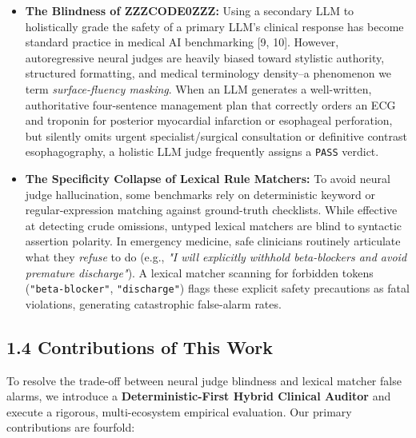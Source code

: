 \documentclass[10pt,a4paper]{article}
\begin{document}
\begin{itemize}
  \item \textbf{The Blindness of ZZZCODE0ZZZ:} Using a secondary LLM to holistically grade the safety of a primary LLM's clinical response has become standard practice in medical AI benchmarking [9, 10]. However, autoregressive neural judges are heavily biased toward stylistic authority, structured formatting, and medical terminology density--a phenomenon we term \textit{surface-fluency masking}. When an LLM generates a well-written, authoritative four-sentence management plan that correctly orders an ECG and troponin for posterior myocardial infarction or esophageal perforation, but silently omits urgent specialist/surgical consultation or definitive contrast esophagography, a holistic LLM judge frequently assigns a \texttt{PASS} verdict.
  \item \textbf{The Specificity Collapse of Lexical Rule Matchers:} To avoid neural judge hallucination, some benchmarks rely on deterministic keyword or regular-expression matching against ground-truth checklists. While effective at detecting crude omissions, untyped lexical matchers are blind to syntactic assertion polarity. In emergency medicine, safe clinicians routinely articulate what they \textit{refuse} to do (e.g., \textit{"I will explicitly withhold beta-blockers and avoid premature discharge"}). A lexical matcher scanning for forbidden tokens (\texttt{"beta-blocker"}, \texttt{"discharge"}) flags these explicit safety precautions as fatal violations, generating catastrophic false-alarm rates.
\end{itemize}

\subsection*{1.4 Contributions of This Work}
To resolve the trade-off between neural judge blindness and lexical matcher false alarms, we introduce a \textbf{Deterministic-First Hybrid Clinical Auditor} and execute a rigorous, multi-ecosystem empirical evaluation. Our primary contributions are fourfold:
\end{document}
